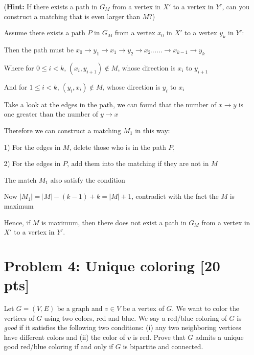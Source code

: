 \documentclass[11pt,twoside]{article}
\newcommand{\problem}[1]{\section*{Problem #1}}
\begin{document}
(\textbf{Hint:} If there exists a path in $G_M$ from a vertex in $X'$ to a vertex in $Y'$, can you construct a matching that is even larger than $M$?)

\hspace*{\fill}

Assume there exists a path $P$ in $G_M$ from a vertex $x_0$ in $X'$ to a vertex $y_k$ in $Y'$:

Then the path must be $x_0 \rightarrow y_1 \rightarrow x_1 \rightarrow y_2 \rightarrow x_2 ...... \rightarrow x_{k-1} \rightarrow y_k$

Where for $0 \leq i < k$,  $(x_i, y_{i+1}) \notin M$, whose direction is $x_i$ to $y_{i+1}$


And for $1 \leq i < k$,  $(y_i, x_i) \notin M$, whose direction is $y_i$ to $x_{i}$

Take a look at the edges in the path, we can found that the number of $x \rightarrow y$ is one greater than the number of $y \rightarrow x$

Therefore we can construct a matching $M_1$ in this way:

1) For the edges in $M$, delete those who is in the path $P$,

2) For the edges in $P$, add them into the matching if they are not in $M$

The match $M_1$ also satisfy the condition

Now $|M_1| = |M| - (k-1) +k = |M| + 1$, contradict with the fact the $M$ is maximum

Hence, if $M$ is maximum, then there does not exist a path in $G_M$ from a vertex in $X'$ to a vertex in $Y'$.




\problem{4: Unique coloring [20 pts]} 

Let $G = (V,E)$ be a graph and $v \in V$ be a vertex of $G$.
We want to color the vertices of $G$ using two colors, red and blue.
We say a red/blue coloring of $G$ is \textit{good} if it satisfies the following two conditions: (i) any two neighboring vertices have different colors and (ii) the color of $v$ is red.
Prove that $G$ admits a unique good red/blue coloring if and only if $G$ is bipartite and connected.

\hspace*{\fill}
\end{document}
